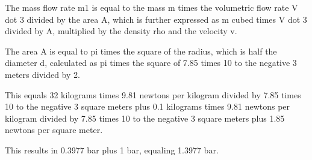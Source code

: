 The mass flow rate m1 is equal to the mass m times the volumetric flow rate V dot 3 divided by the area A, which is further expressed as m cubed times V dot 3 divided by A, multiplied by the density rho and the velocity v.

The area A is equal to pi times the square of the radius, which is half the diameter d, calculated as pi times the square of 7.85 times 10 to the negative 3 meters divided by 2.

This equals 32 kilograms times 9.81 newtons per kilogram divided by 7.85 times 10 to the negative 3 square meters plus 0.1 kilograms times 9.81 newtons per kilogram divided by 7.85 times 10 to the negative 3 square meters plus 1.85 newtons per square meter.

This results in 0.3977 bar plus 1 bar, equaling 1.3977 bar.
